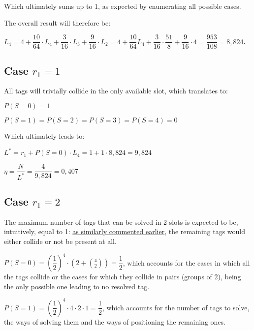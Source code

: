 \documentclass[a4paper,11pt]{article} %
\begin{document}
\medskip

Which ultimately sums up to 1, as expected by enumerating all possible cases.

\bigskip

The overall result will therefore be:

\medskip

$L_4 = 4 + \dfrac{10}{64} \cdot L_4 + \dfrac{3}{16} \cdot L_3 + \dfrac{9}{16} \cdot L_2 = 4 + \dfrac{10}{64} L_4 + \dfrac{3}{16} \cdot \dfrac{51}{8} + \dfrac{9}{16} \cdot 4 = \dfrac{953}{108} = 8,824$.

\subsection{Case $r_1 = 1$}

All tags will trivially collide in the only available slot, which translates to:

\smallskip

$P(S = 0) = 1$

\smallskip

$P(S = 1) = P(S = 2) = P(S = 3) = P(S = 4) = 0$

\bigskip

Which ultimately leads to:

\medskip

$L^{*} = r_1 + P(S = 0) \cdot L_4 = 1 + 1 \cdot 8,824 = 9,824$

\medskip

$\eta = \dfrac{N}{L^{*}} = \dfrac{4}{9,824} = 0,407$

\subsection{Case $r_1 = 2$}

The maximum number of tags that can be solved in 2 slots is expected to be, intuitively, equal to 1: \hyperref[computation-L4]{as similarly commented earlier}, the remaining tags would either collide or not be present at all.

\medskip

$P(S = 0) = \left(\dfrac{1}{2}\right)^4 \cdot \left(2 + \displaystyle\binom{4}{2}\right) = \dfrac{1}{2}$, which accounts for the cases in which all the tags collide or the cases for which they collide in pairs (groups of 2), being the only possible one leading to no resolved tag.

\medskip

$P(S = 1) = \left(\dfrac{1}{2}\right)^4 \cdot 4 \cdot 2 \cdot 1 = \dfrac{1}{2}$, which accounts for the number of tags to solve, the ways of solving them and the ways of positioning the remaining ones.
\end{document}
